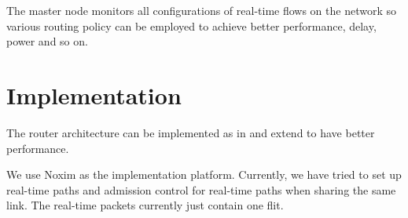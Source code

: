 \documentclass[a4]{article}
\begin{document}
The master node monitors all configurations of real-time flows on the network
so various routing policy can be employed to achieve better performance, delay,
power and so on.

\section{Implementation}
The router architecture can be implemented as in \cite{Rexford98arouter, Zhang_1service} 
and extend \cite{PehDelayModel, PehSpecPipeR} to have better performance.

We use Noxim \cite{Noxim} as the implementation platform. Currently, we have tried
to set up real-time paths and admission control for real-time paths when sharing 
the same link. The real-time packets currently just contain one flit.



\end{document}
